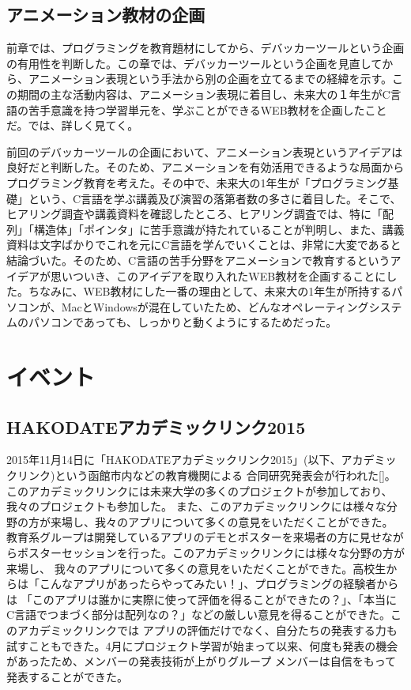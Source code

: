 \documentclass[openany,11pt,papersize]{jsbook}
\begin{document}
\subsection{アニメーション教材の企画}
\par 前章では、プログラミングを教育題材にしてから、デバッカーツールという企画の有用性を判断した。この章では、デバッカーツールという企画を見直してから、アニメーション表現という手法から別の企画を立てるまでの経緯を示す。この期間の主な活動内容は、アニメーション表現に着目し、未来大の１年生がC言語の苦手意識を持つ学習単元を、学ぶことができるWEB教材を企画したことだ。では、詳しく見てく。
\par 前回のデバッカーツールの企画において、アニメーション表現というアイデアは良好だと判断した。そのため、アニメーションを有効活用できるような局面からプログラミング教育を考えた。その中で、未来大の1年生が「プログラミング基礎」という、C言語を学ぶ講義及び演習の落第者数の多さに着目した。そこで、ヒアリング調査や講義資料を確認したところ、ヒアリング調査では、特に「配列」「構造体」「ポインタ」に苦手意識が持たれていることが判明し、また、講義資料は文字ばかりでこれを元にC言語を学んでいくことは、非常に大変であると結論づいた。そのため、C言語の苦手分野をアニメーションで教育するというアイデアが思いついき、このアイデアを取り入れたWEB教材を企画することにした。ちなみに、WEB教材にした一番の理由として、未来大の1年生が所持するパソコンが、MacとWindowsが混在していたため、どんなオペレーティングシステムのパソコンであっても、しっかりと動くようにするためだった。


\section{イベント}


\subsection{HAKODATEアカデミックリンク2015}
2015年11月14日に「HAKODATEアカデミックリンク2015」(以下、アカデミックリンク)という函館市内などの教育機関による
合同研究発表会が行われた[]。このアカデミックリンクには未来大学の多くのプロジェクトが参加しており、我々のプロジェクトも参加した。
また、このアカデミックリンクには様々な分野の方が来場し、我々のアプリについて多くの意見をいただくことができた。
教育系グループは開発しているアプリのデモとポスターを来場者の方に見せながらポスターセッションを行った。このアカデミックリンクには様々な分野の方が来場し、
我々のアプリについて多くの意見をいただくことができた。高校生からは「こんなアプリがあったらやってみたい！」、プログラミングの経験者からは
「このアプリは誰かに実際に使って評価を得ることができたの？」、「本当にC言語でつまづく部分は配列なの？」などの厳しい意見を得ることができた。このアカデミックリンクでは
アプリの評価だけでなく、自分たちの発表する力も試すこともできた。4月にプロジェクト学習が始まって以来、何度も発表の機会があったため、メンバーの発表技術が上がりグループ
メンバーは自信をもって発表することができた。
\end{document}
